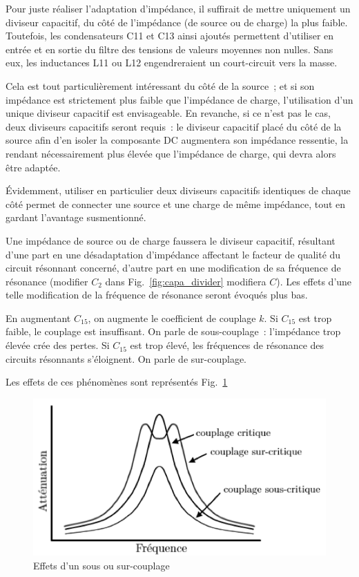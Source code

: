 \documentclass{article}
\begin{document}
Pour juste réaliser l'adaptation d'impédance, il suffirait de mettre uniquement un diviseur capacitif, du côté de l'impédance (de source ou de charge) la plus faible. Toutefois, les condensateurs C11 et C13 ainsi ajoutés permettent d'utiliser en entrée et en sortie du filtre des tensions de valeurs moyennes non nulles. Sans eux, les inductances L11 ou L12 engendreraient un court-circuit vers la masse.

Cela est tout particulièrement intéressant du côté de la source~; et si son impédance est strictement plus faible que l'impédance de charge, l'utilisation d'un unique diviseur capacitif est envisageable. En revanche, si ce n'est pas le cas, deux diviseurs capacitifs seront requis~: le diviseur capacitif placé du côté de la source afin d'en isoler la composante DC augmentera son impédance ressentie, la rendant nécessairement plus élevée que l'impédance de charge, qui devra alors être adaptée.

Évidemment, utiliser en particulier deux diviseurs capacitifs identiques de chaque côté permet de connecter une source et une charge de même impédance, tout en gardant l'avantage susmentionné.



Une impédance de source ou de charge faussera le diviseur capacitif, résultant d'une part en une désadaptation d'impédance affectant le facteur de qualité du circuit résonnant concerné, d'autre part en une modification de sa fréquence de résonance (modifier $C_2$ dans Fig.~\ref{fig:capa_divider} modifiera $C$). Les effets d'une telle modification de la fréquence de résonance seront évoqués plus bas.



En augmentant $C_{15}$, on augmente le coefficient de couplage $k$. Si $C_{15}$ est trop faible, le couplage est insuffisant. On parle de sous-couplage~: l'impédance trop élevée crée des pertes. Si $C_{15}$ est trop élevé, les fréquences de résonance des circuits résonnants s'éloignent. On parle de sur-couplage.

Les effets de ces phénomènes sont représentés Fig.~\ref{fig:coupling_effect}

\begin{figure}[h!]
	\centering
	\includegraphics[width=.4\textwidth]{coupling_effect}
	\caption{Effets d'un sous ou sur-couplage}
	\label{fig:coupling_effect}
\end{figure}
\end{document}

